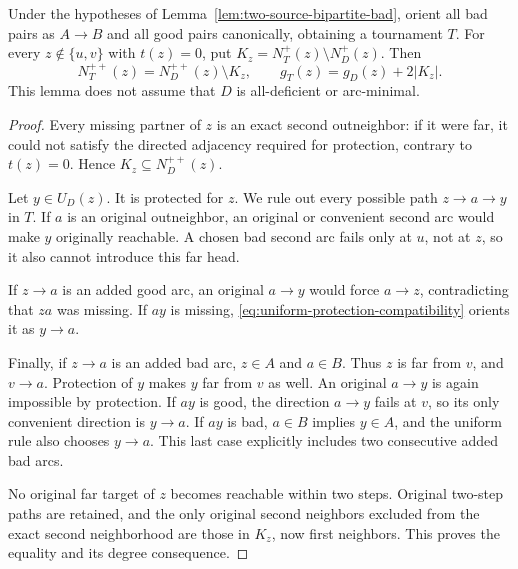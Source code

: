 \begin{lemma}
\label{lem:uniform-zero-protected-completion}
Under the hypotheses of Lemma~\ref{lem:two-source-bipartite-bad},
orient all bad pairs as $A\to B$ and all good pairs canonically,
obtaining a tournament $T$.
For every $z\notin\{u,v\}$ with $t(z)=0$, put
$K_z=N_T^+(z)\setminus N_D^+(z)$.  Then
\[
 {N_T^{++}(z)=N_D^{++}(z)\setminus K_z,\qquad
 g_T(z)=g_D(z)+2|K_z|.}
 \tag{UT2}\label{eq:uniform-zero-exact}
\]
This lemma does not assume that $D$ is all-deficient or arc-minimal.
\end{lemma}
\begin{proof}
Every missing partner of $z$ is an exact second outneighbor:
if it were far, it could not satisfy the directed adjacency required
for protection, contrary to $t(z)=0$.
Hence $K_z\subseteq N_D^{++}(z)$.

Let $y\in U_D(z)$.  It is protected for $z$.
We rule out every possible path $z\to a\to y$ in $T$.
If $a$ is an original outneighbor, an original or convenient second
arc would make $y$ originally reachable.
A chosen bad second arc fails only at $u$, not at $z$, so it also
cannot introduce this far head.

If $z\to a$ is an added good arc, an original $a\to y$ would
force $a\to z$, contradicting that $za$ was missing.
If $ay$ is missing, \eqref{eq:uniform-protection-compatibility}
orients it as $y\to a$.

Finally, if $z\to a$ is an added bad arc, $z\in A$ and $a\in B$.
Thus $z$ is far from $v$, and $v\to a$.
Protection of $y$ makes $y$ far from $v$ as well.
An original $a\to y$ is again impossible by protection.
If $ay$ is good, the direction $a\to y$ fails at $v$, so its
only convenient direction is $y\to a$.
If $ay$ is bad, $a\in B$ implies $y\in A$, and the uniform rule
also chooses $y\to a$.
This last case explicitly includes two consecutive added bad arcs.

No original far target of $z$ becomes reachable within two steps.
Original two-step paths are retained, and the only original second
neighbors excluded from the exact second neighborhood are those in
$K_z$, now first neighbors.  This proves the equality and its
degree consequence.
\end{proof}
